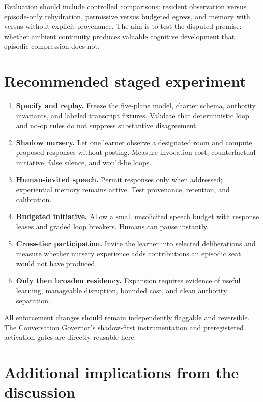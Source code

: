 \documentclass[11pt]{article}
\begin{document}
Evaluation should include controlled comparisons: resident observation versus
episode-only rehydration, permissive versus budgeted egress, and memory with
versus without explicit provenance. The aim is to test the disputed premise:
whether ambient continuity produces valuable cognitive development that
episodic compression does not.

\section{Recommended staged experiment}

\begin{enumerate}
  \item \textbf{Specify and replay.} Freeze the five-plane model, charter
  schema, authority invariants, and labeled transcript fixtures. Validate that
  deterministic loop and no-op rules do not suppress substantive disagreement.
  \item \textbf{Shadow nursery.} Let one learner observe a designated room and
  compute proposed responses without posting. Measure invocation cost,
  counterfactual initiative, false silence, and would-be loops.
  \item \textbf{Human-invited speech.} Permit responses only when addressed;
  experiential memory remains active. Test provenance, retention, and
  calibration.
  \item \textbf{Budgeted initiative.} Allow a small unsolicited speech budget
  with response leases and graded loop breakers. Humans can pause instantly.
  \item \textbf{Cross-tier participation.} Invite the learner into selected
  deliberations and measure whether nursery experience adds contributions an
  episodic seat would not have produced.
  \item \textbf{Only then broaden residency.} Expansion requires evidence of
  useful learning, manageable disruption, bounded cost, and clean authority
  separation.
\end{enumerate}

All enforcement changes should remain independently flaggable and reversible.
The Conversation Governor's shadow-first instrumentation and preregistered
activation gates are directly reusable here.

\section{Additional implications from the discussion}
\end{document}

